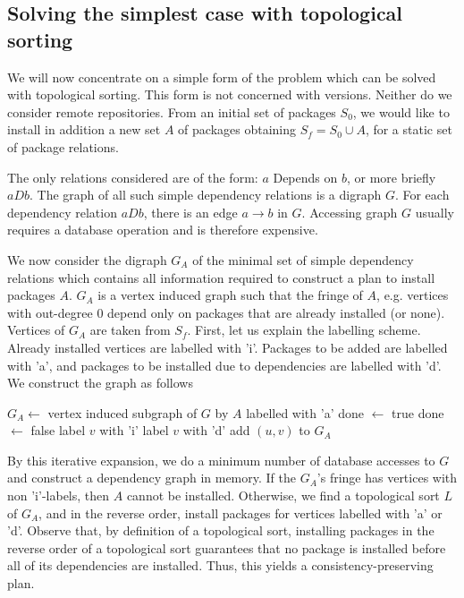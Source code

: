 \documentclass[a4paper,11pt]{article}
\begin{document}
\subsection{Solving the simplest case with topological sorting}

We will now concentrate on a simple form of the problem which can be
solved with topological sorting. This form is not concerned with
versions. Neither do we consider remote repositories.  From an initial
set of packages $S_0$, we would like to install in addition a new set
$A$ of packages obtaining $S_f = S_0 \cup A$, for a static set of package
relations. 

The only relations considered are of the form: $a$ Depends on $b$, or
more briefly $aDb$. The graph of all such simple dependency relations
is a digraph $G$.  For each dependency relation $aDb$, there is an
edge $a \to b$ in $G$.  Accessing graph $G$ usually requires a database
operation and is therefore expensive.

We now consider the digraph $G_A$ of the minimal set of simple
dependency relations which contains all information required to
construct a plan to install packages $A$. $G_A$ is a vertex induced
graph such that the fringe of $A$, e.g. vertices with out-degree $0$
depend only on packages that are already installed (or none). Vertices
of $G_A$ are taken from $S_f$. First, let us explain the labelling
scheme.  Already installed vertices are labelled with 'i'. Packages to
be added are labelled with 'a', and packages to be installed due to
dependencies are labelled with 'd'. We construct the graph as follows
\begin{algorithm}
  \caption{$\textsc{Make-}G_A(G, A)$}
  \label{alg:cons-graph}
  \begin{algorithmic}[1]
\STATE $G_A \gets$ vertex induced subgraph of $G$ by $A$ labelled with 'a'
\REPEAT
  \STATE done $\gets$ true
        \STATE done $\gets$ false
          \STATE label $v$ with 'i'
        \ELSE
          \STATE label $v$ with 'd'
        \ENDIF
        \STATE add $(u,v)$ to $G_A$
       \ENDIF
     \ENDFOR
  \ENDFOR
{}
\end{algorithmic}
\end{algorithm}

By this iterative expansion, we do a minimum number of database
accesses to $G$ and construct a dependency graph in memory. If the
$G_A$'s fringe has vertices with non 'i'-labels, then $A$ cannot be
installed. Otherwise, we find a topological sort $L$ of $G_A$, and in
the reverse order, install packages for vertices labelled with
'a' or 'd'. Observe that, by definition of a topological sort,
installing packages in the reverse order of a topological sort
guarantees that no package is installed before all of its dependencies
are installed. Thus, this yields a consistency-preserving plan.
\end{document}
